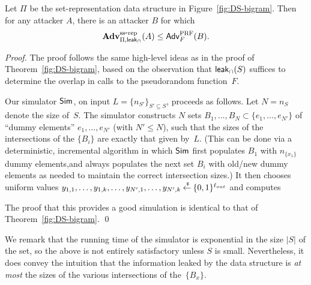 \begin{theorem} %
Let $\Pi$ be the set-representation data structure in
Figure~\ref{fig:DS-bigram}. Then for any attacker $A$, there is an
attacker $B$  for which
\[\mathrm{\mathbf{Adv}}^{\mathrm{ss\mbox{-}rep}}_{\Pi,{\sf leak}_\cap}(A) \leq {\sf Adv}_F^{\rm PRF}(B). \]
\end{theorem}
\begin{proof}
The proof follows the same high-level ideas as in the proof of
Theorem~\ref{fig:DS-bigram}, based on the observation that ${\sf
leak}_\cap(S)$ suffices to determine the overlap in calls to the
pseudorandom function~$F$.

Our simulator ${\sf Sim}$, on input $L = \{n_{S'}\}_{S' \subseteq S}$,
proceeds as follows. Let $N = n_S$ denote the size of~$S$. The
simulator constructs $N$ sets $B_1, \ldots, B_N \subset \{e_1,
\ldots, e_{N'}\}$ of ``dummy elements'' $e_1, \ldots, e_{N'}$ (with
$N' \leq N$), such that the sizes of the intersections of the
$\{B_i\}$ are exactly that given by~$L$. (This can be done via a
deterministic, incremental algorithm in which ${\sf Sim}$ first populates
$B_1$ with $n_{\{x_1\}}$ dummy elements,and always populates the
next set $B_i$ with old/new dummy elements as needed to maintain the
correct intersection sizes.) It then chooses uniform values
$y_{1,1}, \ldots, y_{1,k}, \ldots, y_{N',1}, \ldots, y_{N',k} {\:\stackrel{{\scriptscriptstyle \hspace{0.2em}\$}} {\leftarrow}\:}
\{0,1\}^{\ell_{out}}$ and computes

\begin{figure}[h]
\centering
{}
\end{figure}

The proof that this provides a good simulation is identical to that
of Theorem~\ref{fig:DS-bigram}. \hfill\qed
\end{proof}

We remark that the running time of the simulator is exponential in
the size $|S|$ of the set, so the above is not entirely satisfactory
unless $S$ is small. Nevertheless, it does convey the intuition that
the information leaked by the data structure is \emph{at most} the
sizes of the various intersections of the~$\{B_x\}$.


